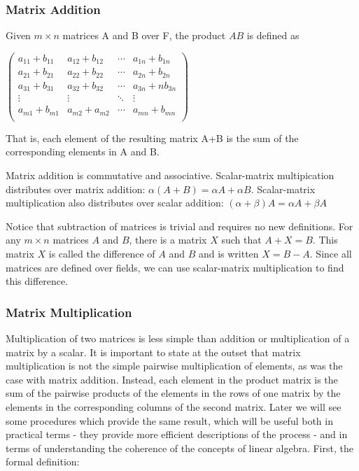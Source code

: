 \documentclass[12pt,letterpaper,final]{article}
\begin{document}
\subsubsection{Matrix Addition}

Given $m \times n$ matrices A and B over F, the product $AB$ is defined as 

$
 \begin{pmatrix}
a_{11}+b_{11} &  a_{12}+b_{12} &  \cdots &   a_{1n}+b_{1n} \\
 a_{21}+b_{21} &  a_{22}+b_{22} &  \cdots &   a_{2n}+b_{2n}\\
 a_{31}+b_{31} &  a_{32}+b_{32} &  \cdots &    a_{3n}+nb_{3n}\\
  \vdots  & \vdots  & \ddots & \vdots  \\
 a_{m1}+b_{m1} &  a_{m2}+a_{m2} &  \cdots &   a_{mn}+b_{mn}\\
 \end{pmatrix}
$

That is, each element of the resulting  matrix A+B is the sum of the corresponding elements in A and B. 

Matrix addition is commutative and associative. Scalar-matrix multipication distributes over matrix addition: $\alpha (A+B) = \alpha A + \alpha B$. Scalar-matrix multiplication also distributes over scalar addition: $(\alpha + \beta) A = \alpha A + \beta A$

Notice that subtraction of matrices is trivial and requires no new definitions. For any $m \times n$ matrices $A$ and $B$, there is a matrix $X$ such that $A + X = B$. This matrix $X$ is called the difference of $A$ and $B$ and is written $X = B - A$. Since all matrices are defined over fields, we can use scalar-matrix multiplication to find this difference. 

\subsubsection{Matrix Multiplication}
Multiplication of two matrices is less simple than addition or multiplication of a matrix by a scalar. It is important to state at the outset that matrix multiplication is not the simple pairwise multiplication of elements, as was the case with matrix addition. Instead, each element in the product matrix is the sum of the pairwise products of the elements in the rows of one matrix by the elements in the corresponding columns of the second matrix. 
Later we will see some procedures which provide the same result, which will be useful both in practical terms - they provide more efficient descriptions of the process - and in terms of understanding the coherence of the concepts of linear algebra. 
First, the formal definition:
\end{document}
